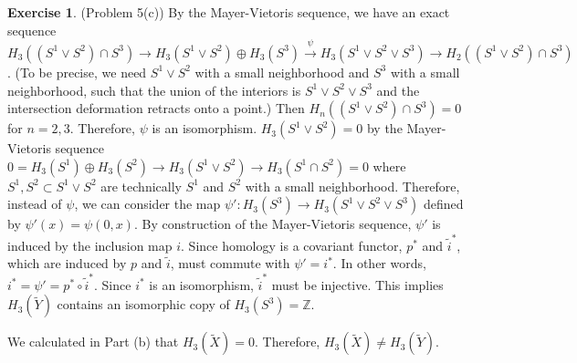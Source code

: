 \documentclass[12pt, psamsfonts]{amsart}
\theoremstyle{definition}
\newtheorem*{exer}{Exercise}
\theoremstyle{remark}
\numberwithin{equation}{section}
\begin{document}
\begin{exer}{(Problem 5(c))}
  By the Mayer-Vietoris sequence, we have an exact sequence $H_3((S^1 \vee S^2) \cap S^3) \rightarrow H_3(S^1 \vee S^2) \oplus H_3(S^3) \xrightarrow{\psi} H_3(S^1 \vee S^2 \vee S^3) \rightarrow H_2((S^1 \vee S^2) \cap S^3)$.
  (To be precise, we need $S^1 \vee S^2$ with a small neighborhood and $S^3$ with a small neighborhood, such that the union of the interiors is $S^1 \vee S^2 \vee S^3$ and the intersection deformation retracts onto a point.)
  Then $H_n((S^1 \vee S^2) \cap S^3) = 0$ for $n = 2, 3$.
  Therefore, $\psi$ is an isomorphism.
  $H_3(S^1 \vee S^2) = 0$ by the Mayer-Vietoris sequence $0 = H_3(S^1) \oplus H_3(S^2) \rightarrow H_3(S^1 \vee S^2) \rightarrow H_3(S^1 \cap S^2) = 0$ where $S^1, S^2 \subset S^1 \vee S^2$ are technically $S^1$ and $S^2$ with a small neighborhood.
  Therefore, instead of $\psi$, we can consider the map $\psi': H_3(S^3) \rightarrow H_3(S^1 \vee S^2 \vee S^3)$ defined by $\psi'(x) = \psi(0, x)$.
  By construction of the Mayer-Vietoris sequence, $\psi'$ is induced by the inclusion map $i$.
  Since homology is a covariant functor, $p^{*}$ and $\tilde{i}^{*}$, which are induced by $p$ and $\tilde{i}$, must commute with $\psi' = i^{*}$.
  In other words, $i^{*} = \psi' = p^{*} \circ \tilde{i}^{*}$.
  Since $i^{*}$ is an isomorphism, $\tilde{i}^{*}$ must be injective.
  This implies $H_3(\tilde{Y})$ contains an isomorphic copy of $H_3(S^3) = \mathbb{Z}$.

  We calculated in Part (b) that $H_3(\tilde{X}) = 0$.
  Therefore, $H_3(\tilde{X}) \ne H_3(\tilde{Y})$.
\end{exer}
\end{document}
